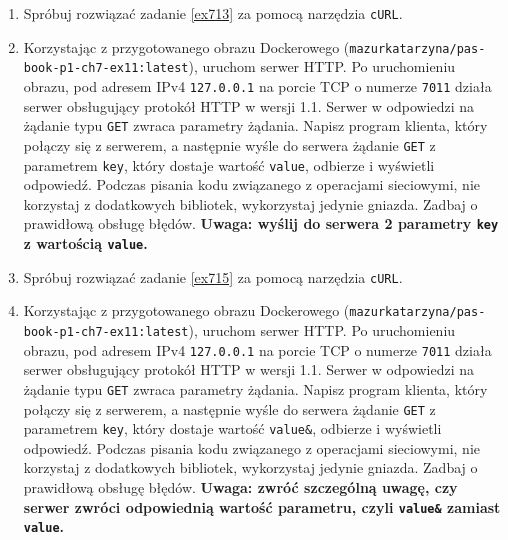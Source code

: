 \documentclass{article}
\begin{document}
\begin{enumerate}[label=\textbf{7.\arabic*}]
\item Spróbuj rozwiązać zadanie \ref{ex713} za pomocą narzędzia \texttt{cURL}.  
\item \label{ex715} Korzystając z przygotowanego obrazu Dockerowego (\texttt{mazurkatarzyna/pas-book-p1-ch7-ex11:latest}), uruchom serwer HTTP.  Po uruchomieniu obrazu, pod adresem IPv4 \texttt{127.0.0.1} na porcie TCP o numerze \texttt{7011} działa serwer obsługujący protokół HTTP w wersji 1.1. Serwer w odpowiedzi na żądanie typu \texttt{GET} zwraca parametry żądania. Napisz program klienta, który połączy się z serwerem, a następnie wyśle do serwera żądanie \texttt{GET} z parametrem \texttt{key}, który dostaje wartość \texttt{value}, odbierze i wyświetli odpowiedź. Podczas pisania kodu związanego z operacjami sieciowymi, nie korzystaj z dodatkowych bibliotek, wykorzystaj jedynie gniazda. Zadbaj o prawidłową obsługę błędów. \textbf{Uwaga: wyślij do serwera 2 parametry \texttt{key} z wartością \texttt{value}.} 
\item Spróbuj rozwiązać zadanie \ref{ex715} za pomocą narzędzia \texttt{cURL}.  
\item \label{ex717} Korzystając z przygotowanego obrazu Dockerowego (\texttt{mazurkatarzyna/pas-book-p1-ch7-ex11:latest}), uruchom serwer HTTP.  Po uruchomieniu obrazu, pod adresem IPv4 \texttt{127.0.0.1} na porcie TCP o numerze \texttt{7011} działa serwer obsługujący protokół HTTP w wersji 1.1. Serwer w odpowiedzi na żądanie typu \texttt{GET} zwraca parametry żądania. Napisz program klienta, który połączy się z serwerem, a następnie wyśle do serwera żądanie \texttt{GET} z parametrem \texttt{key}, który dostaje wartość \texttt{value\&}, odbierze i wyświetli odpowiedź. Podczas pisania kodu związanego z operacjami sieciowymi, nie korzystaj z dodatkowych bibliotek, wykorzystaj jedynie gniazda. Zadbaj o prawidłową obsługę błędów. \textbf{Uwaga: zwróć szczególną uwagę, czy serwer zwróci odpowiednią wartość parametru, czyli \texttt{value\&} zamiast \texttt{value}.} \


\end{enumerate}
\end{document}
